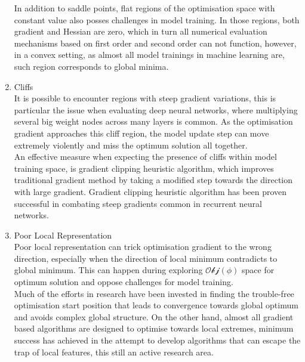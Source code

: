 \begin{enumerate}
In addition to saddle points, flat regions of the optimisation space with constant value also posses challenges in model training. In those regions, both gradient and Hessian are zero, which in turn all numerical evaluation mechanisms based on first order and second order can not function, however, in a convex setting, as almost all model trainings in machine learning are, such region corresponds to global minima. 
    \item Cliffs \\
It is possible to encounter regions with steep gradient variations, this is particular the issue when evaluating deep neural networks, where multiplying several big weight nodes across many layers is common. As the optimisation gradient approaches this cliff region, the model update step can move extremely violently and miss the optimum solution all together. \\
An effective measure when expecting the presence of cliffs within model training space, is gradient clipping heuristic algorithm, which improves traditional gradient method by taking a modified step towards the direction with large gradient. Gradient clipping heuristic algorithm has been proven successful in combating steep gradients common in recurrent neural networks.~\cite{Pascanu2012UnderstandingTE} 
    \item Poor Local Representation \\
Poor local representation can trick optimisation gradient to the wrong direction, especially when the direction of local minimum contradicts to global minimum. This can happen during exploring $\mathcal{Obj}(\phi)$ space for optimum solution and oppose challenges for model training. \\
Much of the efforts in research have been invested in finding the trouble-free optimisation start position that leads to convergence towards global optimum and avoids complex global structure. On the other hand, almost all gradient based algorithms are designed to optimise towards local extremes, minimum success has achieved in the attempt to develop algorithms that can escape the trap of local features, this still an active research area. \\
\end{enumerate}

